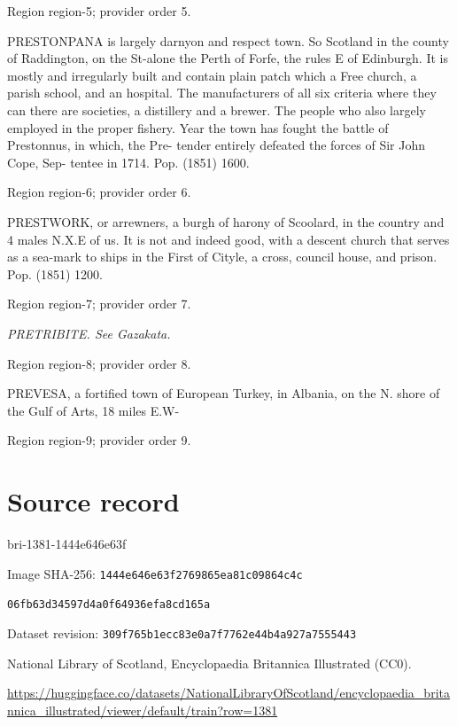 \documentclass[11pt]{article}
\begin{document}
{\scriptsize\color{gray} Region region-5; provider order 5.\par}
\medskip

PRESTONPANA is largely darnyon and respect town. So Scotland in the county of Raddington, on the St-alone the Perth of Forfe, the rules E of Edinburgh. It is mostly and irregularly built and contain plain patch which a Free church, a parish school, and an hospital. The manufacturers of all six criteria where they can there are societies, a distillery and a brewer. The people who also largely employed in the proper fishery. Year the town has fought the battle of Prestonnus, in which, the Pre- tender entirely defeated the forces of Sir John Cope, Sep- tentee in 1714. Pop. (1851) 1600.
\par

{\scriptsize\color{gray} Region region-6; provider order 6.\par}
\medskip

PRESTWORK, or arrewners, a burgh of harony of Scoolard, in the country and 4 males N.X.E of us. It is not and indeed good, with a descent church that serves as a sea-mark to ships in the First of Cityle, a cross, council house, and prison. Pop. (1851) 1200.
\par

{\scriptsize\color{gray} Region region-7; provider order 7.\par}
\medskip

{\small\itshape PRETRIBITE. See Gazakata.\par}

{\scriptsize\color{gray} Region region-8; provider order 8.\par}
\medskip

PREVESA, a fortified town of European Turkey, in Albania, on the N. shore of the Gulf of Arts, 18 miles E.W-
\par

{\scriptsize\color{gray} Region region-9; provider order 9.\par}
\medskip
\newpage\section*{Source record}
bri-1381-1444e646e63f\par
Image SHA-256: \texttt{1444e646e63f2769865ea81c09864c4c}\par\texttt{06fb63d34597d4a0f64936efa8cd165a}\par
Dataset revision: \texttt{309f765b1ecc83e0a7f7}\texttt{762e44b4a927a7555443}\par
National Library of Scotland, Encyclopaedia Britannica Illustrated (CC0).\par
\url{https://huggingface.co/datasets/NationalLibraryOfScotland/encyclopaedia_britannica_illustrated/viewer/default/train?row=1381}
\end{document}
